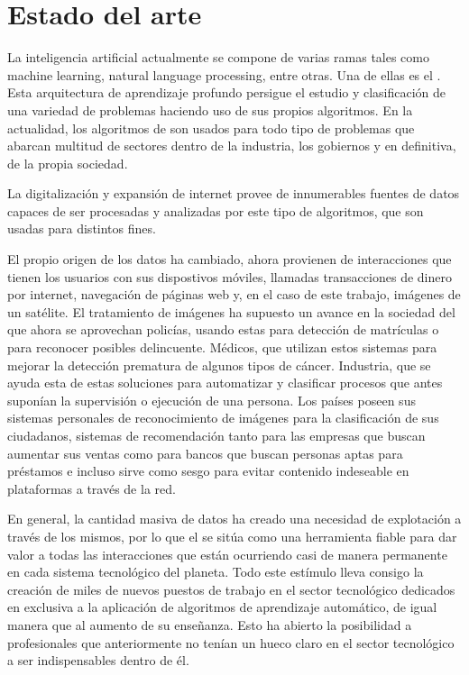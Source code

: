 \section{Estado del arte}\label{sec:estado-del-arte}
La inteligencia artificial actualmente se compone de varias ramas tales como machine learning, natural language processing, entre otras.
Una de ellas es el .
Esta arquitectura de aprendizaje profundo persigue el estudio y clasificación de una variedad de problemas
haciendo uso de sus propios algoritmos.
En la actualidad, los algoritmos de  son usados para todo tipo de problemas que abarcan multitud de sectores dentro de la industria, los gobiernos y en definitiva, de la propia sociedad.

La digitalización y expansión de internet provee de innumerables fuentes de datos capaces de ser procesadas y analizadas por este tipo de algoritmos, que son usadas para distintos fines.

El propio origen de los datos ha cambiado, ahora provienen de interacciones que tienen los usuarios con sus dispostivos móviles, llamadas
transacciones de dinero por internet, navegación de páginas web y, en el caso de este trabajo, imágenes de un satélite.
El tratamiento de imágenes ha supuesto un avance en la sociedad del que ahora se aprovechan policías, usando estas para detección de matrículas o para reconocer posibles delincuente.
Médicos, que utilizan estos sistemas para mejorar la detección prematura de algunos tipos de cáncer.
Industria, que se ayuda esta de estas soluciones para automatizar y clasificar procesos que antes suponían la supervisión o ejecución de una persona.
Los países poseen sus sistemas personales de reconocimiento de imágenes para la clasificación de sus ciudadanos, sistemas de recomendación tanto para las empresas que buscan aumentar sus ventas como para bancos que buscan personas aptas para préstamos e incluso sirve como sesgo para evitar contenido indeseable en plataformas a través de la red.


En general, la cantidad masiva de datos ha creado una necesidad de explotación a
través de los mismos, por lo que el  se sitúa como una herramienta fiable para dar valor a todas las interacciones que están ocurriendo casi de manera permanente
en cada sistema tecnológico del planeta.
Todo este estímulo lleva consigo la creación de miles de nuevos puestos de trabajo en el sector tecnológico dedicados en exclusiva a la aplicación de algoritmos de aprendizaje automático, de igual manera que al aumento de su enseñanza.
Esto ha abierto la posibilidad a profesionales que anteriormente no tenían un hueco claro en el sector tecnológico a ser indispensables dentro de él.


